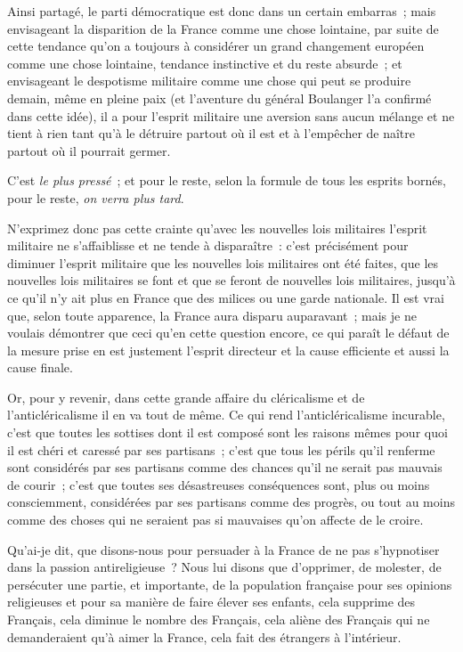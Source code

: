 \documentclass[french,twoside]{book} %
\begin{document}
Ainsi partagé, le parti démocratique est donc dans un certain embarras ; mais envisageant la disparition de la France comme une chose lointaine, par suite de cette tendance qu’on a toujours à considérer un grand changement européen comme une chose lointaine, tendance instinctive et du reste absurde ; et envisageant le despotisme militaire comme une chose qui peut se produire demain, même en pleine paix (et l’aventure du général Boulanger l’a confirmé dans cette idée), il a pour l’esprit militaire une aversion sans aucun mélange et ne tient à rien tant qu’à le détruire partout où il est et à l’empêcher de naître partout où il pourrait germer.\par
C’est {\itshape le plus pressé} ; et pour le reste, selon la formule de tous les esprits bornés, pour le reste, {\itshape on verra plus tard}.\par
N’exprimez donc pas cette crainte qu’avec les nouvelles lois militaires l’esprit militaire ne s’affaiblisse et ne tende à disparaître : c’est précisément  pour diminuer l’esprit militaire que les nouvelles lois militaires ont été faites, que les nouvelles lois militaires se font et que se feront de nouvelles lois militaires, jusqu’à ce qu’il n’y ait plus en France que des milices ou une garde nationale. Il est vrai que, selon toute apparence, la France aura disparu auparavant ; mais je ne voulais démontrer que ceci qu’en cette question encore, ce qui paraît le défaut de la mesure prise en est justement l’esprit directeur et la cause efficiente et aussi la cause finale.\par
Or, pour y revenir, dans cette grande affaire du cléricalisme et de l’anticléricalisme il en va tout de même. Ce qui rend l’anticléricalisme incurable, c’est que toutes les sottises dont il est composé sont les raisons mêmes pour quoi il est chéri et caressé par ses partisans ; c’est que tous les périls qu’il renferme sont considérés par ses partisans comme des chances qu’il ne serait pas mauvais de courir ; c’est que toutes ses désastreuses conséquences sont, plus ou moins consciemment, considérées par ses partisans comme des progrès, ou tout au moins comme des choses qui ne seraient pas si mauvaises qu’on affecte de le croire.\par
Qu’ai-je dit, que disons-nous pour persuader à la France de ne pas s’hypnotiser dans la passion antireligieuse ? Nous lui disons que d’opprimer,  de molester, de persécuter une partie, et importante, de la population française pour ses opinions religieuses et pour sa manière de faire élever ses enfants, cela supprime des Français, cela diminue le nombre des Français, cela aliène des Français qui ne demanderaient qu’à aimer la France, cela fait des étrangers à l’intérieur.\par
\end{document}
